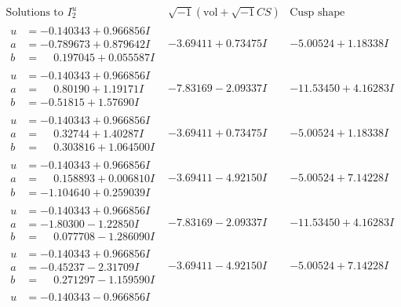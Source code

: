 \documentclass[1p]{elsarticle_modified}
\theoremstyle{definition}
\newcommand{\I}{\sqrt{-1}}
\begin{document}
$$\begin{array}{c|c|c}  
\text{Solutions to }I^u_{2}& \I (\text{vol} + \sqrt{-1}CS) & \text{Cusp shape}\\
 \hline 
\begin{aligned}
u &= -0.140343 + 0.966856 I \\
a &= -0.789673 + 0.879642 I \\
b &= \phantom{-}0.197045 + 0.055587 I\end{aligned}
 & -3.69411 + 0.73475 I & -5.00524 + 1.18338 I \\ \hline\begin{aligned}
u &= -0.140343 + 0.966856 I \\
a &= \phantom{-}0.80190 + 1.19171 I \\
b &= -0.51815 + 1.57690 I\end{aligned}
 & -7.83169 - 2.09337 I & -11.53450 + 4.16283 I \\ \hline\begin{aligned}
u &= -0.140343 + 0.966856 I \\
a &= \phantom{-}0.32744 + 1.40287 I \\
b &= \phantom{-}0.303816 + 1.064500 I\end{aligned}
 & -3.69411 + 0.73475 I & -5.00524 + 1.18338 I \\ \hline\begin{aligned}
u &= -0.140343 + 0.966856 I \\
a &= \phantom{-}0.158893 + 0.006810 I \\
b &= -1.104640 + 0.259039 I\end{aligned}
 & -3.69411 - 4.92150 I & -5.00524 + 7.14228 I \\ \hline\begin{aligned}
u &= -0.140343 + 0.966856 I \\
a &= -1.80300 - 1.22850 I \\
b &= \phantom{-}0.077708 - 1.286090 I\end{aligned}
 & -7.83169 - 2.09337 I & -11.53450 + 4.16283 I \\ \hline\begin{aligned}
u &= -0.140343 + 0.966856 I \\
a &= -0.45237 - 2.31709 I \\
b &= \phantom{-}0.271297 - 1.159590 I\end{aligned}
 & -3.69411 - 4.92150 I & -5.00524 + 7.14228 I \\ \hline\begin{aligned}
u &= -0.140343 - 0.966856 I \\

\end{aligned}
\end{array}$$
\end{document}
